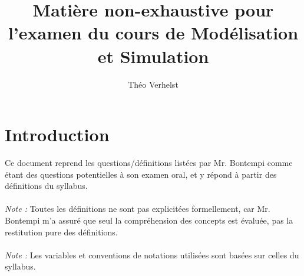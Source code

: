 \documentclass[a4paper]{article}
\author{Théo Verhelst}
\title{Matière non-exhaustive pour l'examen du cours de Modélisation et Simulation}
\begin{document}
\maketitle
\section{Introduction}
Ce document reprend les questions/définitions listées par Mr. Bontempi comme étant des questions potentielles à son examen
oral, et y répond à partir des définitions du syllabus.
\paragraph{}
\emph{Note :} Toutes les définitions ne sont pas explicitées formellement, car Mr. Bontempi m'a assuré que seul
la compréhension des concepts est évaluée, pas la restitution pure des définitions.
\paragraph{}
\emph{Note :} Les variables et conventions de notations utilisées sont basées sur celles du syllabus.
\end{document}
